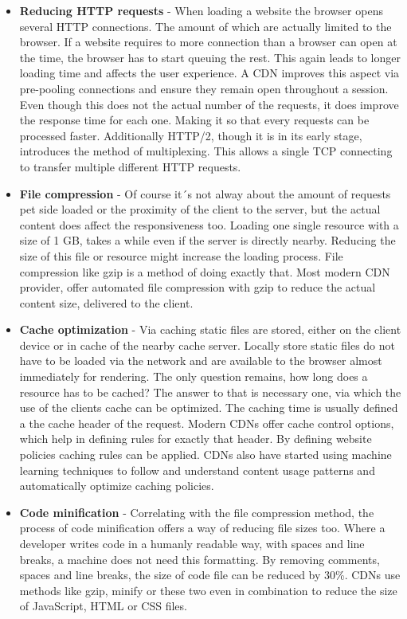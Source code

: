 \begin{itemize}
	\item \textbf{Reducing HTTP requests} - When loading a website the browser opens several HTTP connections. The amount of which are actually limited to the browser. If a website requires to more connection than a browser can open at the time, the browser has to start queuing the rest. This again leads to longer loading time and affects the user experience. A CDN improves this aspect via pre-pooling connections and ensure they remain open throughout a session. Even though this does not the actual number of the requests, it does improve the response time for each one. Making it so that every requests can be processed faster. Additionally HTTP/2, though it is in its early stage, introduces the method of multiplexing. This allows a single TCP connecting to transfer multiple different HTTP requests.  
	
	\item \textbf{File compression} - Of course it´s not alway about the amount of requests pet side loaded or the proximity of the client to the server, but the actual content does affect the responsiveness too. Loading one single resource with a size of 1 GB, takes a while even if the server is directly nearby. Reducing the size of this file or resource might increase the loading process. File compression like gzip is a method of doing exactly that. Most modern CDN provider, offer automated file compression with gzip to reduce the actual content size, delivered to the client.
	
	\item \textbf{Cache optimization} - Via caching static files are stored, either on the client device or in cache of the nearby cache server. Locally store static files do not have to be loaded via the network and are available to the browser almost immediately for rendering. The only question remains, how long does a resource has to be cached? The answer to that is necessary one, via which the use of the clients cache can be optimized. The caching time is usually defined a the cache header of the request. Modern CDNs offer cache control options, which help in defining rules for exactly that header. By defining website policies caching rules can be applied. 
	CDNs also have started using machine learning techniques to follow and understand content usage patterns and automatically optimize caching policies.
	 
	\item \textbf{Code minification} - Correlating with the file compression method, the process of code minification offers a way of reducing file sizes too. Where a developer writes code in a humanly readable way, with spaces and line breaks, a machine does not need this formatting. By removing comments, spaces and line breaks, the size of code file can be reduced by 30\%. CDNs use methods like gzip, minify or these two even in combination to reduce the size of JavaScript, HTML or CSS files.
	

\end{itemize}
